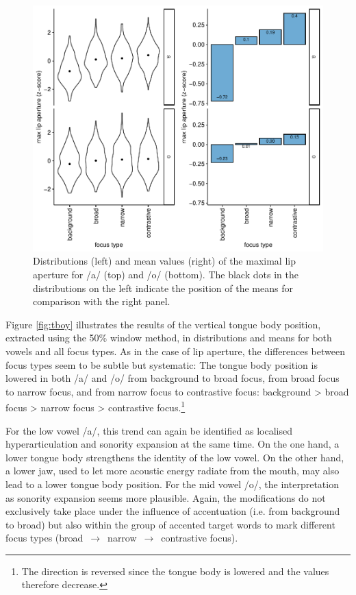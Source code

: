 \begin{figure}[htbp]
\begin{center}
\includegraphics[width=\textwidth]{figures/ch7/eukl_max.pdf}
\caption[Distributions and mean values of the maximal lip aperture.]{Distributions (left) and mean values (right) of the maximal lip aperture for /a/ (top) and /o/ (bottom). The black dots in the distributions on the left indicate the position of the means for comparison with the right panel.}
\label{fig:eukl_max}
\end{center}
\end{figure}

Figure \ref{fig:tboy} illustrates the results of the vertical tongue body position, extracted using the 50\% window method, in distributions and means for both vowels and all focus types. As in the case of lip aperture, the differences between focus types seem to be subtle but systematic: The tongue body position is lowered in both /a/ and /o/ from background to broad focus, from broad focus to narrow focus, and from narrow focus to contrastive focus: background > broad focus > narrow focus > contrastive focus.\footnote{The direction is reversed since the tongue body is lowered and the values therefore decrease.}

For the low vowel /a/, this trend can again be identified as localised hyperarticulation and sonority expansion at the same time. On the one hand, a lower tongue body strengthens the identity of the low vowel. On the other hand, a lower jaw, used to let more acoustic energy radiate from the mouth, may also lead to a lower tongue body position. For the mid vowel /o/, the interpretation as sonority expansion seems more plausible. Again, the modifications do not exclusively take place under the influence of accentuation (i.e. from background to broad) but also within the group of accented target words to mark different focus types (broad $\,\to\,$ narrow $\,\to\,$ contrastive focus).

